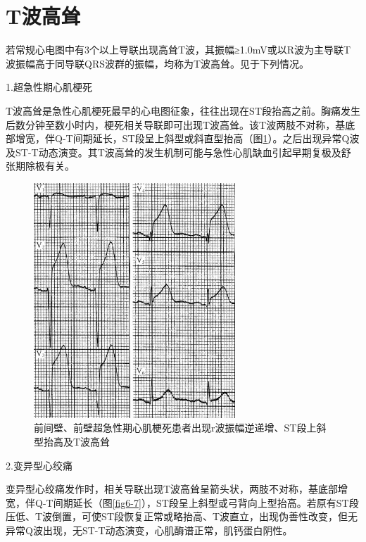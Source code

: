 \protect\hypertarget{text00012.htmlux5cux23subid93}{}{}

\section{T波高耸}

若常规心电图中有3个以上导联出现高耸T波，其振幅≥1.0mV或以R波为主导联T波振幅高于同导联QRS波群的振幅，均称为T波高耸。见于下列情况。

1.超急性期心肌梗死

T波高耸是急性心肌梗死最早的心电图征象，往往出现在ST段抬高之前。胸痛发生后数分钟至数小时内，梗死相关导联即可出现T波高耸。该T波两肢不对称，基底部增宽，伴Q-T间期延长，ST段呈上斜型或斜直型抬高（图\ref{fig6-6}）。之后出现异常Q波及ST-T动态演变。其T波高耸的发生机制可能与急性心肌缺血引起早期复极及舒张期除极有关。

\begin{figure}[!htbp]
 \centering
 \includegraphics[width=2.97917in,height=3.47917in]{./images/Image00098.jpg}
 \captionsetup{justification=centering}
 \caption{前间壁、前壁超急性期心肌梗死患者出现r波振幅逆递增、ST段上斜型抬高及T波高耸}
 \label{fig6-6}
  \end{figure} 

2.变异型心绞痛

变异型心绞痛发作时，相关导联出现T波高耸呈箭头状，两肢不对称，基底部增宽，伴Q-T间期延长（图\ref{fig6-7}），ST段呈上斜型或弓背向上型抬高。若原有ST段压低、T波倒置，可使ST段恢复正常或略抬高、T波直立，出现伪善性改变，但无异常Q波出现，无ST-T动态演变，心肌酶谱正常，肌钙蛋白阴性。

